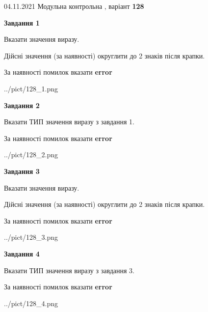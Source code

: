 \documentclass[11pt, ukrainian]{article}
\begin{document}
{04.11.2021 Модульна контрольна , варіант  \No \textbf { 128 }\par}
{
\begin {large}
{\begin {center}\textbf{Завдання 1}\end {center}}\par
Вказати значення виразу. \par
Дійсні значення (за наявності) округлити до 2 знаків після крапки. \par
За наявності помилок вказати \textbf{error}

\begin{center}
	{../pict/128_1.png}
\end{center}
\newpage

{\begin {center}\textbf{Завдання 2}\end {center}}\par
Вказати ТИП значення виразу з завдання 1. \par
За наявності помилок вказати \textbf{error}

\begin{center}
	{../pict/128_2.png}
\end{center}
\newpage

{\begin {center}\textbf{Завдання 3}\end {center}}\par
Вказати значення виразу. \par
Дійсні значення (за наявності) округлити до 2 знаків після крапки. \par
За наявності помилок вказати \textbf{error}

\begin{center}
	{../pict/128_3.png}
\end{center}
\newpage

{\begin {center}\textbf{Завдання 4}\end {center}}\par
Вказати ТИП значення виразу з завдання 3. \par
За наявності помилок вказати \textbf{error}

\begin{center}
	{../pict/128_4.png}
\end{center}
\newpage


\end{large}}
\end{document}
